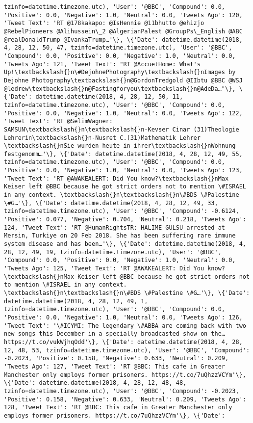 \documentclass[11pt]{article}
\begin{document}
\begin{Verbatim}[commandchars=\\\{\}]
tzinfo=datetime.timezone.utc), 'User': '@BBC', 'Compound': 0.0, 'Positive': 0.0, 'Negative': 1.0, 'Neutral': 0.0, 'Tweets Ago': 120, 'Tweet Text': 'RT @178kakapo: @IsHennie @11bhutto @ehizjo @RebelPioneers @Alihussein\_2 @AlgerianPalest @GroupPs\_English @ABC @realDonaldTrump @IvankaTrump…'\}, \{'Date': datetime.datetime(2018, 4, 28, 12, 50, 47, tzinfo=datetime.timezone.utc), 'User': '@BBC', 'Compound': 0.0, 'Positive': 0.0, 'Negative': 1.0, 'Neutral': 0.0, 'Tweets Ago': 121, 'Tweet Text': "RT @AccuetHome: What's Up!\textbackslash{}n\#DejohnePhotography\textbackslash{}nImages by Dejohne Photography\textbackslash{}n@GordonTredgold @IIbtu @BBC @WSJ @ledrew\textbackslash{}n@Fastingforyou\textbackslash{}n@AdeDa…"\}, \{'Date': datetime.datetime(2018, 4, 28, 12, 50, 11, tzinfo=datetime.timezone.utc), 'User': '@BBC', 'Compound': 0.0, 'Positive': 0.0, 'Negative': 1.0, 'Neutral': 0.0, 'Tweets Ago': 122, 'Tweet Text': 'RT @SelimWagner: SAMSUN\textbackslash{}n\textbackslash{}n-Kevser Cinar (31)Theologie Lehrerin\textbackslash{}n-Nusret C.(31)Mathematik Lehrer \textbackslash{}nSie wurden heute in ihrer\textbackslash{}nWohnung festgenomm…'\}, \{'Date': datetime.datetime(2018, 4, 28, 12, 49, 55, tzinfo=datetime.timezone.utc), 'User': '@BBC', 'Compound': 0.0, 'Positive': 0.0, 'Negative': 1.0, 'Neutral': 0.0, 'Tweets Ago': 123, 'Tweet Text': 'RT @AWAKEALERT: Did You know?\textbackslash{}nMax Keiser left @BBC because he got strict orders not to mention \#ISRAEL in any context. \textbackslash{}n\textbackslash{}n\#BDS \#Palestine \#G…'\}, \{'Date': datetime.datetime(2018, 4, 28, 12, 49, 33, tzinfo=datetime.timezone.utc), 'User': '@BBC', 'Compound': -0.6124, 'Positive': 0.077, 'Negative': 0.704, 'Neutral': 0.218, 'Tweets Ago': 124, 'Tweet Text': 'RT @HumanRightsTR: HALIME GULSU arrested at Mersin, Turkiye on 20 Feb 2018. She has been suffering rare immune system disease and has been…'\}, \{'Date': datetime.datetime(2018, 4, 28, 12, 49, 19, tzinfo=datetime.timezone.utc), 'User': '@BBC', 'Compound': 0.0, 'Positive': 0.0, 'Negative': 1.0, 'Neutral': 0.0, 'Tweets Ago': 125, 'Tweet Text': 'RT @AWAKEALERT: Did You know?\textbackslash{}nMax Keiser left @BBC because he got strict orders not to mention \#ISRAEL in any context. \textbackslash{}n\textbackslash{}n\#BDS \#Palestine \#G…'\}, \{'Date': datetime.datetime(2018, 4, 28, 12, 49, 1, tzinfo=datetime.timezone.utc), 'User': '@BBC', 'Compound': 0.0, 'Positive': 0.0, 'Negative': 1.0, 'Neutral': 0.0, 'Tweets Ago': 126, 'Tweet Text': '\#ICYMI: The legendary \#ABBA are coming back with two new songs this December in a specially broadcasted show on the… https://t.co/vukWjhqOdd'\}, \{'Date': datetime.datetime(2018, 4, 28, 12, 48, 53, tzinfo=datetime.timezone.utc), 'User': '@BBC', 'Compound': -0.2023, 'Positive': 0.158, 'Negative': 0.633, 'Neutral': 0.209, 'Tweets Ago': 127, 'Tweet Text': 'RT @BBC: This cafe in Greater Manchester only employs former prisoners. https://t.co/7uQhzzVCYm'\}, \{'Date': datetime.datetime(2018, 4, 28, 12, 48, 48, tzinfo=datetime.timezone.utc), 'User': '@BBC', 'Compound': -0.2023, 'Positive': 0.158, 'Negative': 0.633, 'Neutral': 0.209, 'Tweets Ago': 128, 'Tweet Text': 'RT @BBC: This cafe in Greater Manchester only employs former prisoners. https://t.co/7uQhzzVCYm'\}, \{'Date': 
\end{Verbatim}
\end{document}
